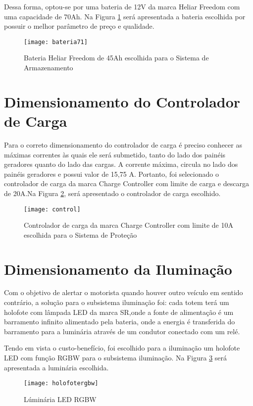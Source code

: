Dessa forma, optou-se por uma bateria de 12V da marca Heliar Freedom com uma capacidade de 70Ah. Na Figura \ref{fig:bateria71} será apresentada a bateria escolhida por possuir o melhor parâmetro de preço e qualidade.


\begin{figure}[H]
\centering
\texttt{[image: bateria71]}
\caption{Bateria Heliar Freedom de 45Ah escolhida para o Sistema de Armazenamento}
\label{fig:bateria71}
\end{figure}
\FloatBarrier

\section{Dimensionamento do Controlador de Carga}

Para o correto dimensionamento do controlador de carga é preciso conhecer as máximas correntes às quais ele será submetido, tanto do lado dos painéis geradores quanto do lado das cargas. A corrente máxima, circula no lado dos painéis geradores e possui valor de 15,75 A. Portanto, foi selecionado o controlador de carga da marca Charge Controller com limite de carga e descarga de 20A.Na Figura \ref{fig:control}, será apresentado o controlador de carga escolhido.

\begin{figure}[H]
\centering
\texttt{[image: control]}
    \caption{Controlador de carga da marca Charge Controller com limite de 10A escolhida para o Sistema de Proteção}
\label{fig:control}
\end{figure}
\FloatBarrier

\section{Dimensionamento da Iluminação}

Com o objetivo de alertar o motorista quando houver outro veículo em sentido contrário, a solução para o subsistema iluminação foi: cada totem terá um holofote com lâmpada LED da marca SR,onde a fonte de alimentação é um barramento infinito alimentado pela bateria, onde a energia é transferida do barramento para a luminária através de um condutor conectado com um relé. 

Tendo em vista o custo-benefício, foi escolhido para a iluminação um holofote LED com função RGBW para o subsistema iluminação. Na Figura \ref{fig:holofotergbw} será apresentada a luminária escolhida.

    \begin{figure}[h!]
\centering
\texttt{[image: holofotergbw]}
\caption{Lúminária LED RGBW}
\label{fig:holofotergbw}
\end{figure}
\vspace*{\fill}
\pagebreak

